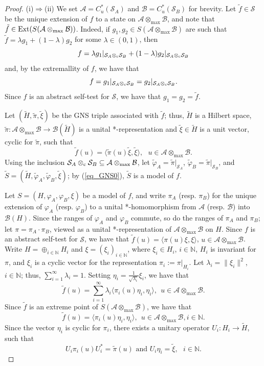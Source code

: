 \documentclass[11pt]{amsart}
\theoremstyle{definition}
\newcommand\nph{\varphi}
\newcommand{\cl}[1]{\mathcal{#1}}
\newcommand{\bb}[1]{\mathbb{#1}}
\newcommand{\mc}[1]{\mathcal{#1}}
\begin{document}
\begin{proof}
(i)$\Rightarrow$(ii) 
We set $\cl A = C^*_u(\cl S_A)$ and $\cl B = C^*_u(\cl S_B)$ for brevity. 
Let $\tilde{f}\in\mc{S}$ be the unique extension of $f$ to a state on 
$\cl A\otimes_{\max}\cl B$, and note that 
$\tilde{f}\in {\rm Ext}(S(\cl A\otimes_{\max}\cl B))$.
Indeed, 
if $g_1, g_2 \in S(\cl A\otimes_{\max}\cl B)$ are such that 
$\tilde{f} = \lambda g_1 + (1-\lambda)g_2$ for some 
$\lambda\in (0,1)$, then 
$$f = \lambda 
g_1|_{\cl S_A\otimes_{\rm c}\cl S_B} + 
(1-\lambda)g_2|_{\cl S_A\otimes_{\rm c}\cl S_B}$$
and, by the extremallity of $f$, 
we have that 
$$f = g_1|_{\cl S_A\otimes_{\rm c}\cl S_B} = 
g_2|_{\cl S_A\otimes_{\rm c}\cl S_B}.$$
Since $f$ is an abstract self-test for $\cl S$, 
we have that $g_1 = g_2 = \tilde{f}$. 


Let $(\tilde{H},\tilde{\pi},\tilde{\xi})$ be the GNS triple associated with 
$\tilde{f}$; thus, $\tilde{H}$ is a Hilbert space, 
$\tilde{\pi} : \cl A\otimes_{\max}\cl B\to \cl B(\tilde{H})$ is a 
unital *-representation and $\tilde{\xi}\in \tilde{H}$ is a unit vector, 
cyclic for $\tilde{\pi}$, such that 
\begin{equation}\label{eq_GNS0}
\tilde{f}(u) = \langle \tilde{\pi}(u)\tilde{\xi},\tilde{\xi}\rangle, \ \ \ 
u\in \cl A\otimes_{\max}\cl B.
\end{equation}
Using the inclusion $\cl S_A\otimes_{\rm c}\cl S_B\subseteq \cl A\otimes_{\max}\cl B$, 
let $\tilde{\nph}_A = \tilde{\pi}|_{\cl S_A}$, 
$\tilde{\nph}_B = \tilde{\pi}|_{\cl S_B}$, and 
$\tilde{S} = (\tilde{H},\tilde{\nph}_A, \tilde{\nph}_B,\tilde{\xi})$;
by (\ref{eq_GNS0}), $\tilde{S}$ is a model of $f$. 

Let $S = (H,\nph_A, \nph_B,\xi)$ be a model of $f$, and 
write $\pi_A$ (resp. $\pi_B$) for the unique extension of 
$\nph_A$ (resp. $\nph_B$) to a unital *-homomorphism from 
$\cl A$ (resp. $\cl B$) into $\cl B(H)$. Since the ranges of 
$\nph_A$ and $\nph_B$ commute, so do the ranges of $\pi_A$ and $\pi_B$; 
let $\pi = \pi_A\cdot \pi_B$, viewed as a unital *-representation of 
$\cl A\otimes_{\max}\cl B$ on $H$. 
Since $f$ is an abstract self-test for $\cl S$, we have that 
$\tilde{f}(u) = \langle \pi(u)\xi,\xi\rangle$,
$u\in \cl A\otimes_{\max}\cl B$. 
Write $H = \oplus_{i\in \bb{N}} H_i$ and $\xi = (\xi_i)_{i\in \bb{N}}$, 
where $\xi_i\in H_i$, $i\in \bb{N}$, 
$H_i$ is invariant for $\pi$, and $\xi_i$ is a cyclic vector 
for the representation $\pi_i := \pi|_{H_i}$. 
Let $\lambda_i = \|\xi_i\|^2$, $i\in \bb{N}$; thus, 
$\sum_{i=1}^{\infty} \lambda_i = 1$.  
Setting $\eta_i = \frac{1}{\sqrt{\lambda_i}}\xi_i$, we have that 
$$\tilde{f}(u) = \sum_{i=1}^{\infty} \lambda_i \langle \pi_i(u)\eta_i,\eta_i\rangle, 
\ \ u\in \cl A\otimes_{\max}\cl B.$$
Since $\tilde{f}$ is an extreme point of $S(\cl A\otimes_{\max}\cl B)$, 
we have that 
$$\tilde{f}(u) = \langle \pi_i(u)\eta_i,\eta_i\rangle, 
\ \ u\in \cl A\otimes_{\max}\cl B, i\in \bb{N}.$$
Since the vector $\eta_i$ is cyclic for $\pi_i$, there exists a 
unitary operator $U_i : H_i \to \tilde{H}$, such that 
\begin{equation}\label{eq_Ui}
U_i \pi_i(u) U_i^* = \tilde{\pi}(u) 
\mbox{ and } U_i \eta_i = \tilde{\xi}, \ \ \ i\in \bb{N}. 
\end{equation}



\end{proof}
\end{document}
